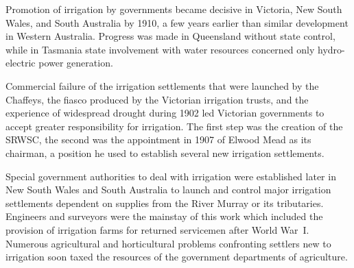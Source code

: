 \closure
Promotion of irrigation by governments became decisive in Victoria,
New South Wales, and South Australia by 1910, a few years earlier than
similar development in Western Australia.  Progress was made in
Queensland without state control, while in Tasmania state involvement
with water resources concerned only hydro-electric power generation.

Commercial failure of the irrigation settlements that were launched by
the Chaffeys, the fiasco produced by the Victorian irrigation trusts,
and the experience of widespread drought during 1902 led Victorian
governments to accept greater responsibility for irrigation.  The
first step was the creation of the SRWSC, the second was the
appointment in 1907 of Elwood Mead as its chairman, a position he used
to establish several new irrigation settlements.

Special government authorities to deal with irrigation were
established later in New South Wales and South Australia to launch and
control major irrigation settlements dependent on supplies from the
River Murray or its tributaries.  Engineers and surveyors were the
mainstay of this work which included the provision of irrigation farms
for returned servicemen after World War~I.  Numerous agricultural and
horticultural problems confronting settlers new to irrigation soon
taxed the resources of the government departments of agriculture.

